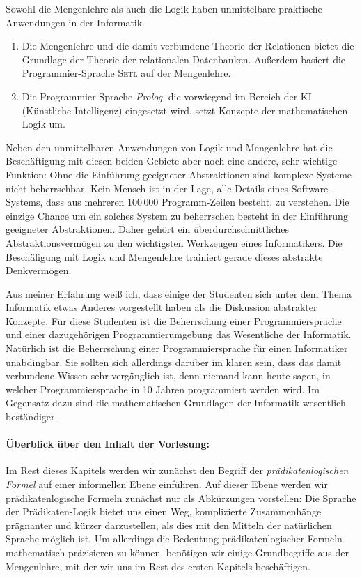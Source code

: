 Sowohl die Mengenlehre als auch die Logik haben unmittelbare praktische Anwendungen in der
Informatik.
\begin{enumerate}
\item Die Mengenlehre und die damit verbundene Theorie der Relationen bietet die Grundlage
      der Theorie der relationalen Datenbanken.  Außerdem basiert die Programmier-Sprache \textsc{Setl}
      auf der Mengenlehre.
\item Die Programmier-Sprache \textsl{Prolog}, die vorwiegend im Bereich der KI
      (Künstliche Intelligenz) eingesetzt wird, setzt Konzepte der mathematischen
      Logik um.  
\end{enumerate}
Neben den unmittelbaren Anwendungen von Logik und Mengenlehre hat die Beschäftigung mit
diesen beiden Gebiete aber noch eine andere, sehr wichtige Funktion:
Ohne die Einführung geeigneter Abstraktionen sind komplexe Systeme nicht beherrschbar.
Kein Mensch ist in der Lage, alle Details eines Software-Systems, dass aus mehreren
$100\,000$ Programm-Zeilen besteht, zu verstehen.   Die einzige Chance um ein solches
System zu beherrschen besteht in der Einführung geeigneter Abstraktionen.
Daher gehört ein überdurchschnittliches Abstraktionsvermögen zu den wichtigsten Werkzeugen
eines Informatikers.  Die Beschäfigung mit Logik und Mengenlehre trainiert gerade dieses
abstrakte Denkvermögen. 


Aus meiner Erfahrung weiß ich, dass einige der Studenten sich unter dem Thema Informatik etwas Anderes
vorgestellt haben als die Diskussion abstrakter Konzepte.  Für diese Studenten ist die Beherrschung
einer Programmiersprache und einer dazugehörigen Programmierumgebung das Wesentliche der Informatik.
Natürlich ist die Beherrschung einer Programmiersprache für einen Informatiker unabdingbar.  Sie
sollten sich allerdings darüber im klaren sein, dass das damit verbundene Wissen sehr vergänglich
ist, denn niemand kann heute sagen, in welcher Programmiersprache in 10 Jahren programmiert werden wird.
Im Gegensatz dazu sind die mathematischen Grundlagen der Informatik wesentlich beständiger.


\paragraph{Überblick über den Inhalt der Vorlesung:} 
Im Rest dieses Kapitels werden wir zunächst den Begriff der 
\emph{prädikatenlogischen Formel} auf einer informellen Ebene einführen.  Auf dieser Ebene
werden wir prädikatenlogische Formeln zunächst nur als Abkürzungen vorstellen:
Die Sprache der Prädikaten-Logik bietet uns einen Weg, komplizierte
Zusammenhänge prägnanter und kürzer darzustellen, als dies mit den Mitteln der natürlichen
Sprache möglich ist.  Um allerdings die Bedeutung prädikatenlogischer Formeln 
mathematisch präzisieren zu können, benötigen wir einige Grundbegriffe aus der
Mengenlehre, mit der wir uns im Rest des ersten Kapitels beschäftigen.

